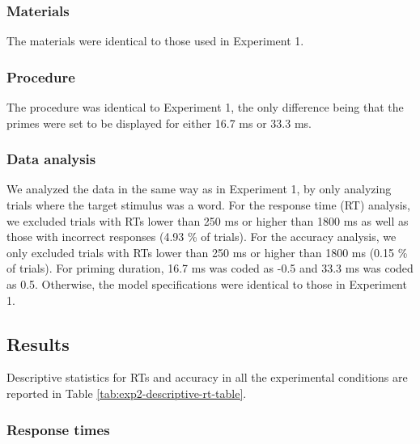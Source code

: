 \documentclass[
  english,
  man,floatsintext]{apa6}
\begin{document}
\hypertarget{materials-1}{%
\subsubsection{Materials}\label{materials-1}}

The materials were identical to those used in Experiment 1.

\hypertarget{procedure-1}{%
\subsubsection{Procedure}\label{procedure-1}}

The procedure was identical to Experiment 1, the only difference being that the primes were set to be displayed for either 16.7 ms or 33.3 ms.

\hypertarget{data-analysis-1}{%
\subsubsection{Data analysis}\label{data-analysis-1}}

We analyzed the data in the same way as in Experiment 1, by only analyzing trials where the target stimulus was a word. For the response time (RT) analysis, we excluded trials with RTs lower than 250 ms or higher than 1800 ms as well as those with incorrect responses (4.93 \% of trials). For the accuracy analysis, we only excluded trials with RTs lower than 250 ms or higher than 1800 ms (0.15 \% of trials). For priming duration, 16.7 ms was coded as -0.5 and 33.3 ms was coded as 0.5. Otherwise, the model specifications were identical to those in Experiment 1.

\hypertarget{results-1}{%
\subsection{Results}\label{results-1}}

Descriptive statistics for RTs and accuracy in all the experimental conditions are reported in Table \ref{tab:exp2-descriptive-rt-table}.

\hypertarget{response-times-1}{%
\subsubsection{Response times}\label{response-times-1}}
\end{document}
